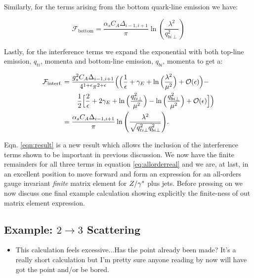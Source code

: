 		Similarly, for the terms arising from the bottom quark-line emission we have:

		\begin{equation}
		\mathcal{F}_{\text{bottom}} = \frac{\alpha_sC_A\Delta_{i-1, i+1}}{\pi}\ln\left(\frac{\lambda^2}{q_{bi\perp}^2}\right)
		\end{equation}

		Lastly, for the interference terms we expand the exponential with both top-line emission, $q_{ti}$,
		momenta and bottom-line emission, $q_{bi}$, momenta to get a:

		\begin{align}
		\begin{split}
			\mathcal{F}_{\text{interf.}} &= \frac{g_s^2C_A\Delta_{i-1, i+1}}{4^{1+\epsilon}\pi^{2+\epsilon}}
			\Big(\Big(\frac{1}{\epsilon} + \gamma_E +  \ln\Big(\frac{\lambda^2}{\mu^2}\Big) +
			\mathcal{O}(\epsilon)\Big) - \\
			&\hspace{0.75cm}\frac{1}{2}\Big[\frac{2}{\epsilon} + 2 \gamma_E +
			\ln\Big(\frac{q_{ti\perp}^2}{\mu^2}\Big)
			- \ln\Big(\frac{q_{bi\perp}^2}{\mu^2}\Big) +
			\mathcal{O}(\epsilon)\Big]\Big) \\
			&= \frac{\alpha_sC_A\Delta_{i-1, i+1}}{\pi}\ln\Bigg(\frac{\lambda^2}{\sqrt{q_{ti\perp}^2
			q_{bi\perp}^2}}\Bigg).
			\label{eqn:result}
		\end{split}
		\end{align}

		Eqn. \ref{eqn:result} is a new result which allows the inclusion of the interference terms shown
		to be important in previous discussion.  We now have the finite remainders for all three terms in
		equation \eqref{eq:allorderreal} and we are, at last, in an excellent position to move forward and
		form an expression for an all-orders gauge invariant \emph{finite} matrix element for $Z/\gamma^*$ plus
		jets.  Before pressing on we now discuss one final example calculation showing explicitly the
		finite-ness of out matrix element expression.

	\subsection{Example: $2\rightarrow3$ Scattering}

		{\color{red}
		\begin{itemize}
			\item This calculation feels excessive...Has the point already been made?  It's a really short
			calculation but I'm pretty sure anyone reading by now will have got the point and/or be bored.
		\end{itemize}
		}

